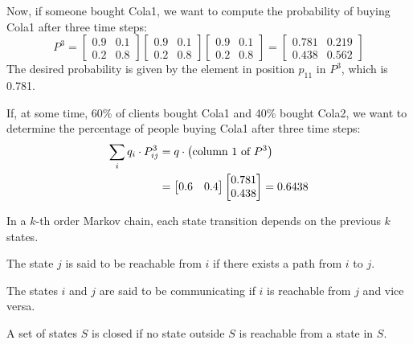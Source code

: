 \begin{example}
    Now, if someone bought Cola1, we want to compute the probability of buying Cola1 after three time steps:
    \[P^3=
    \begin{bmatrix}
        0.9 & 0.1 \\
        0.2 & 0.8
    \end{bmatrix}
    \begin{bmatrix}
        0.9 & 0.1 \\
        0.2 & 0.8
    \end{bmatrix}
    \begin{bmatrix}
        0.9 & 0.1 \\
        0.2 & 0.8
    \end{bmatrix}
    =
    \begin{bmatrix}
        0.781 & 0.219 \\
        0.438 & 0.562
    \end{bmatrix}\]
    The desired probability is given by the element in position $p_{11}$ in $P^3$, which is 0.781.

    If, at some time, 60\% of clients bought Cola1 and 40\% bought Cola2, we want to determine the percentage of people buying Cola1 after three time steps:
    \begin{align*}
        \sum_i q_i \cdot P^3_{ij}   &= q \cdot \left( \textnormal{column } 1 \textnormal{ of }P^3\right) \\
                                    &= \begin{bmatrix} 0.6 & 0.4 \end{bmatrix} \begin{bmatrix} 0.781 \\ 0.438 \end{bmatrix}=0.6438
    \end{align*}
\end{example}
\begin{definition}
    In a $k$-th order Markov chain, each state transition depends on the previous $k$ states.
\end{definition}
\begin{definition}
    The state $j$ is said to be reachable from $i$ if there exists a path from $i$ to $j$.
\end{definition}
\begin{definition}
    The states $i$ and $j$ are said to be communicating if $i$ is reachable from $j$ and vice versa.
\end{definition}
\begin{definition}
    A set of states $S$ is closed if no state outside $S$ is reachable from a state in $S$.
\end{definition}
